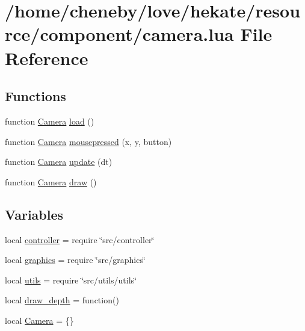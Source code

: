 \hypertarget{camera_8lua}{\section{/home/cheneby/love/hekate/resource/component/camera.lua File Reference}
\label{camera_8lua}
}
\subsection*{Functions}
\begin{DoxyCompactItemize}
\item 
function \hyperlink{camera_8lua_a60ee871fa7bdd28508803133dc40a60e}{Camera} \hyperlink{camera_8lua_a3139a802c1c5c3275637309a1038783c}{load} ()
\item 
function \hyperlink{camera_8lua_a60ee871fa7bdd28508803133dc40a60e}{Camera} \hyperlink{camera_8lua_a9aa3ec3d257f0cfe0db9854f0df13bf1}{mousepressed} (x, y, button)
\item 
function \hyperlink{camera_8lua_a60ee871fa7bdd28508803133dc40a60e}{Camera} \hyperlink{camera_8lua_a81c09113d6f4fb189c478ebd4ddf0a8a}{update} (dt)
\item 
function \hyperlink{camera_8lua_a60ee871fa7bdd28508803133dc40a60e}{Camera} \hyperlink{camera_8lua_acdb7bc65c85ef9be79b29cf93c777656}{draw} ()
\end{DoxyCompactItemize}
\subsection*{Variables}
\begin{DoxyCompactItemize}
\item 
local \hyperlink{camera_8lua_a42ca47a193e6b84d402c2a9fab0a69f1}{controller} = require \char`\"{}src/controller\char`\"{}
\item 
local \hyperlink{camera_8lua_aae06ace8bee01f93d02dfaa4436de916}{graphics} = require \char`\"{}src/graphics\char`\"{}
\item 
local \hyperlink{camera_8lua_a9b2ba82def3d3656dc370bac0a641700}{utils} = require \char`\"{}src/utils/utils\char`\"{}
\item 
local \hyperlink{camera_8lua_ae3fb2517a395f6d9e0f185b934763ad6}{draw\-\_\-depth} = function()
\item 
local \hyperlink{camera_8lua_a60ee871fa7bdd28508803133dc40a60e}{Camera} = \{\}
\end{DoxyCompactItemize}


